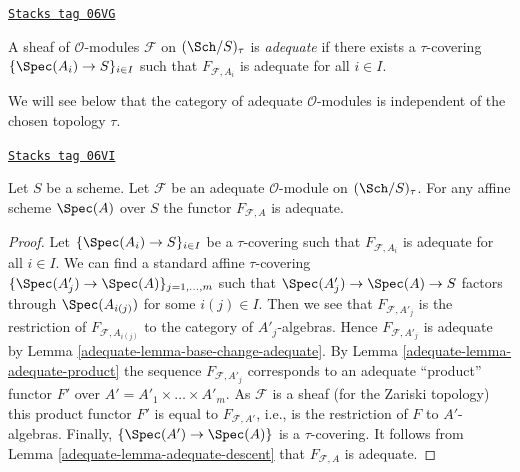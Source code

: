 \begin{definition}[Adequate]
\label{adequate-definition-adequate}
\href{https://stacks.math.columbia.edu/tag/06VG}{\texttt{Stacks tag 06VG}}

A sheaf of $\mathcal{O}$-modules $\mathcal{F}$ on $(\Sch/S)_\tau$ is
{\it adequate} if there exists a $\tau$-covering
$\{\Spec(A_i) \to S\}_{i \in I}$ such that $F_{\mathcal{F}, A_i}$ is
adequate for all $i \in I$.
\end{definition}

We will see below that the category of adequate $\mathcal{O}$-modules
is independent of the chosen topology $\tau$.

\begin{lemma}
\label{adequate-lemma-adequate-local}
\href{https://stacks.math.columbia.edu/tag/06VI}{\texttt{Stacks tag 06VI}}

Let $S$ be a scheme. Let $\mathcal{F}$ be an adequate $\mathcal{O}$-module on
$(\Sch/S)_\tau$. For any affine scheme $\Spec(A)$ over $S$
the functor $F_{\mathcal{F}, A}$ is adequate.
\end{lemma}

\begin{proof}

Let $\{\Spec(A_i) \to S\}_{i \in I}$ be a $\tau$-covering
such that $F_{\mathcal{F}, A_i}$ is adequate for all $i \in I$.
We can find a standard affine $\tau$-covering
$\{\Spec(A'_j) \to \Spec(A)\}_{j = 1, \ldots, m}$
such that $\Spec(A'_j) \to \Spec(A) \to S$ factors
through $\Spec(A_{i(j)})$ for some $i(j) \in I$. Then we see that
$F_{\mathcal{F}, A'_j}$ is the restriction of
$F_{\mathcal{F}, A_{i(j)}}$ to the category of $A'_j$-algebras.
Hence $F_{\mathcal{F}, A'_j}$ is adequate by
Lemma \ref{adequate-lemma-base-change-adequate}.
By
Lemma \ref{adequate-lemma-adequate-product}
the sequence
$F_{\mathcal{F}, A'_j}$ corresponds to an adequate ``product'' functor
$F'$ over $A' = A'_1 \times \ldots \times A'_m$. As $\mathcal{F}$ is a
sheaf (for the Zariski topology) this product functor $F'$ is equal
to $F_{\mathcal{F}, A'}$, i.e., is the restriction of $F$ to $A'$-algebras.
Finally,  $\{\Spec(A') \to \Spec(A)\}$ is a $\tau$-covering.
It follows from
Lemma \ref{adequate-lemma-adequate-descent}
that $F_{\mathcal{F}, A}$ is adequate.
\end{proof}

